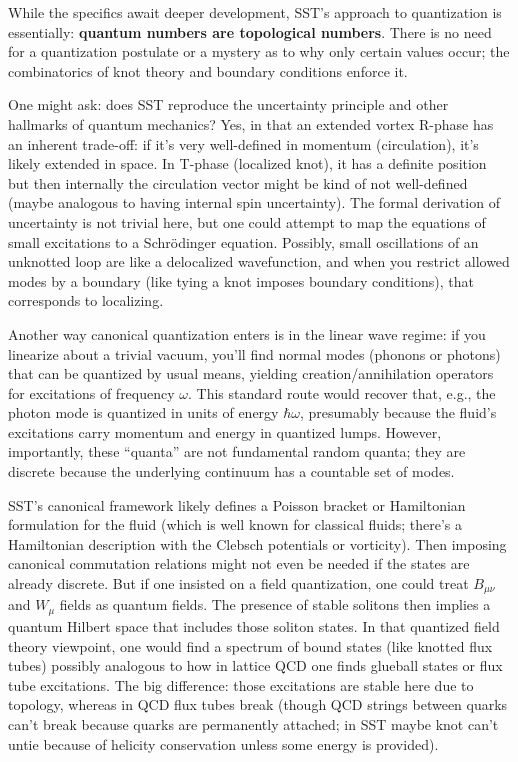 \documentclass[10pt,reprint,aps,onecolumn,nofootinbib]{revtex4-2}
\begin{document}
While the specifics await deeper development, SST's approach to quantization is essentially: \textbf{quantum numbers are topological numbers}. There is no need for a quantization postulate or a mystery as to why only certain values occur; the combinatorics of knot theory and boundary conditions enforce it.

One might ask: does SST reproduce the uncertainty principle and other hallmarks of quantum mechanics? Yes, in that an extended vortex R-phase has an inherent trade-off: if it's very well-defined in momentum (circulation), it's likely extended in space. In T-phase (localized knot), it has a definite position but then internally the circulation vector might be kind of not well-defined (maybe analogous to having internal spin uncertainty). The formal derivation of uncertainty is not trivial here, but one could attempt to map the equations of small excitations to a Schrödinger equation. Possibly, small oscillations of an unknotted loop are like a delocalized wavefunction, and when you restrict allowed modes by a boundary (like tying a knot imposes boundary conditions), that corresponds to localizing.

Another way canonical quantization enters is in the linear wave regime: if you linearize about a trivial vacuum, you'll find normal modes (phonons or photons) that can be quantized by usual means, yielding creation/annihilation operators for excitations of frequency $\omega$. This standard route would recover that, e.g., the photon mode is quantized in units of energy $\hbar\omega$, presumably because the fluid’s excitations carry momentum and energy in quantized lumps. However, importantly, these ``quanta'' are not fundamental random quanta; they are discrete because the underlying continuum has a countable set of modes.

SST’s canonical framework likely defines a Poisson bracket or Hamiltonian formulation for the fluid (which is well known for classical fluids; there's a Hamiltonian description with the Clebsch potentials or vorticity). Then imposing canonical commutation relations might not even be needed if the states are already discrete. But if one insisted on a field quantization, one could treat $B_{\mu\nu}$ and $W_\mu$ fields as quantum fields. The presence of stable solitons then implies a quantum Hilbert space that includes those soliton states. In that quantized field theory viewpoint, one would find a spectrum of bound states (like knotted flux tubes) possibly analogous to how in lattice QCD one finds glueball states or flux tube excitations. The big difference: those excitations are stable here due to topology, whereas in QCD flux tubes break (though QCD strings between quarks can't break because quarks are permanently attached; in SST maybe knot can't untie because of helicity conservation unless some energy is provided).
\end{document}
